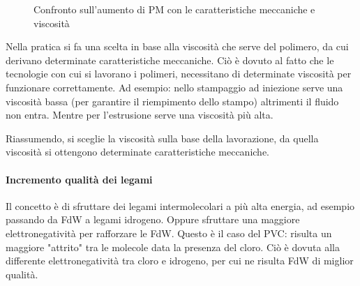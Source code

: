 \begin{figure}
\centering
{}\quad
{}
\caption{Confronto sull'aumento di \ac{PM} con le caratteristiche meccaniche e viscosità}
\label{fig:ConfPM}
\end{figure}

Nella pratica si fa una scelta in base alla viscosità che serve del polimero, da cui derivano determinate caratteristiche meccaniche.
Ciò è dovuto al fatto che le tecnologie con cui si lavorano i polimeri, necessitano di determinate viscosità per funzionare correttamente.
Ad esempio: nello stampaggio ad iniezione serve una viscosità bassa (per garantire il riempimento dello stampo) altrimenti il fluido non entra.
Mentre per l'estrusione serve una viscosità più alta.

Riassumendo, si sceglie la viscosità sulla base della lavorazione, da quella viscosità si ottengono determinate caratteristiche meccaniche.

\paragraph{Incremento qualità dei legami}
Il concetto è di sfruttare dei legami intermolecolari a più alta energia, ad esempio passando da \ac{FdW} a legami idrogeno. Oppure sfruttare una maggiore elettronegatività per rafforzare le \ac{FdW}.
Questo è il caso del \ac{PVC}: risulta un maggiore "attrito" tra le molecole data la presenza del cloro. Ciò è dovuta alla differente elettronegatività tra cloro e idrogeno, per cui ne risulta \ac{FdW} di miglior qualità.

